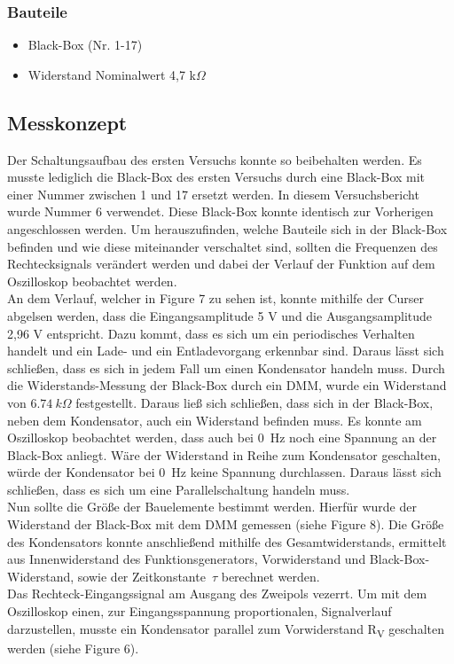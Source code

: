 \documentclass[a4paper,12pt]{article}
\begin{document}
\subsubsection*{Bauteile}
\begin{itemize}
\item Black-Box (Nr. 1-17)
\item Widerstand Nominalwert 4,7 k$\Omega$
\end{itemize}




\subsection{Messkonzept}
Der Schaltungsaufbau des ersten Versuchs konnte so beibehalten werden. Es musste lediglich die Black-Box des ersten Versuchs durch eine Black-Box mit einer Nummer zwischen 1 und 17 ersetzt werden. In diesem Versuchsbericht wurde Nummer 6 verwendet. Diese Black-Box konnte identisch zur Vorherigen angeschlossen werden. Um herauszufinden, welche Bauteile sich in der Black-Box befinden und wie diese miteinander verschaltet sind, sollten die Frequenzen des Rechtecksignals verändert werden und dabei der Verlauf der Funktion auf dem Oszilloskop beobachtet werden.\\
An dem Verlauf, welcher in Figure 7 zu sehen ist, konnte mithilfe der Curser abgelsen werden, dass die Eingangsamplitude 5 V und die Ausgangsamplitude 2,96 V entspricht. Dazu kommt, dass es sich um ein periodisches Verhalten handelt und ein Lade- und ein Entladevorgang erkennbar sind. Daraus lässt sich schließen, dass es sich in jedem Fall um einen Kondensator handeln muss. Durch die Widerstands-Messung der Black-Box durch ein DMM, wurde ein Widerstand von \(6.74~k\Omega\) festgestellt. Daraus ließ sich schließen, dass sich in der Black-Box, neben dem Kondensator, auch ein Widerstand befinden muss. Es konnte am Oszilloskop beobachtet werden, dass auch bei 0~Hz noch eine Spannung an der Black-Box anliegt. Wäre der Widerstand in Reihe zum Kondensator geschalten, würde der Kondensator bei 0~Hz keine Spannung durchlassen. Daraus lässt sich schließen, dass es sich um eine Parallelschaltung handeln muss.
\\Nun sollte die Größe der Bauelemente bestimmt werden. Hierfür wurde der Widerstand der Black-Box mit dem DMM gemessen (siehe Figure 8). Die Größe des Kondensators konnte anschließend mithilfe des Gesamtwiderstands, ermittelt aus Innenwiderstand des Funktionsgenerators, Vorwiderstand und Black-Box-Widerstand, sowie der Zeitkonstante~$\tau$ berechnet werden.\\
\noindent Das Rechteck-Eingangssignal am Ausgang des Zweipols vezerrt. Um mit dem Oszilloskop einen, zur Eingangsspannung proportionalen, Signalverlauf darzustellen, musste ein Kondensator parallel zum Vorwiderstand R\textsubscript{V} geschalten werden (siehe Figure 6).
\end{document}

